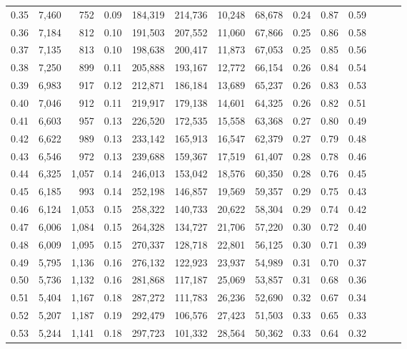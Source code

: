 \begin{tabular}{rrrrrrrrrrrrrr}
0.35 &  7,460 &    752 &  0.09 &  184,319 &  214,736 &  10,248 &  68,678 &  0.24 &  0.87 &      0.59 \\
0.36 &  7,184 &    812 &  0.10 &  191,503 &  207,552 &  11,060 &  67,866 &  0.25 &  0.86 &      0.58 \\
0.37 &  7,135 &    813 &  0.10 &  198,638 &  200,417 &  11,873 &  67,053 &  0.25 &  0.85 &      0.56 \\
0.38 &  7,250 &    899 &  0.11 &  205,888 &  193,167 &  12,772 &  66,154 &  0.26 &  0.84 &      0.54 \\
0.39 &  6,983 &    917 &  0.12 &  212,871 &  186,184 &  13,689 &  65,237 &  0.26 &  0.83 &      0.53 \\
0.40 &  7,046 &    912 &  0.11 &  219,917 &  179,138 &  14,601 &  64,325 &  0.26 &  0.82 &      0.51 \\
0.41 &  6,603 &    957 &  0.13 &  226,520 &  172,535 &  15,558 &  63,368 &  0.27 &  0.80 &      0.49 \\
0.42 &  6,622 &    989 &  0.13 &  233,142 &  165,913 &  16,547 &  62,379 &  0.27 &  0.79 &      0.48 \\
0.43 &  6,546 &    972 &  0.13 &  239,688 &  159,367 &  17,519 &  61,407 &  0.28 &  0.78 &      0.46 \\
0.44 &  6,325 &  1,057 &  0.14 &  246,013 &  153,042 &  18,576 &  60,350 &  0.28 &  0.76 &      0.45 \\
0.45 &  6,185 &    993 &  0.14 &  252,198 &  146,857 &  19,569 &  59,357 &  0.29 &  0.75 &      0.43 \\
0.46 &  6,124 &  1,053 &  0.15 &  258,322 &  140,733 &  20,622 &  58,304 &  0.29 &  0.74 &      0.42 \\
0.47 &  6,006 &  1,084 &  0.15 &  264,328 &  134,727 &  21,706 &  57,220 &  0.30 &  0.72 &      0.40 \\
0.48 &  6,009 &  1,095 &  0.15 &  270,337 &  128,718 &  22,801 &  56,125 &  0.30 &  0.71 &      0.39 \\
0.49 &  5,795 &  1,136 &  0.16 &  276,132 &  122,923 &  23,937 &  54,989 &  0.31 &  0.70 &      0.37 \\
0.50 &  5,736 &  1,132 &  0.16 &  281,868 &  117,187 &  25,069 &  53,857 &  0.31 &  0.68 &      0.36 \\
0.51 &  5,404 &  1,167 &  0.18 &  287,272 &  111,783 &  26,236 &  52,690 &  0.32 &  0.67 &      0.34 \\
0.52 &  5,207 &  1,187 &  0.19 &  292,479 &  106,576 &  27,423 &  51,503 &  0.33 &  0.65 &      0.33 \\
0.53 &  5,244 &  1,141 &  0.18 &  297,723 &  101,332 &  28,564 &  50,362 &  0.33 &  0.64 &      0.32 \\

\end{tabular}
